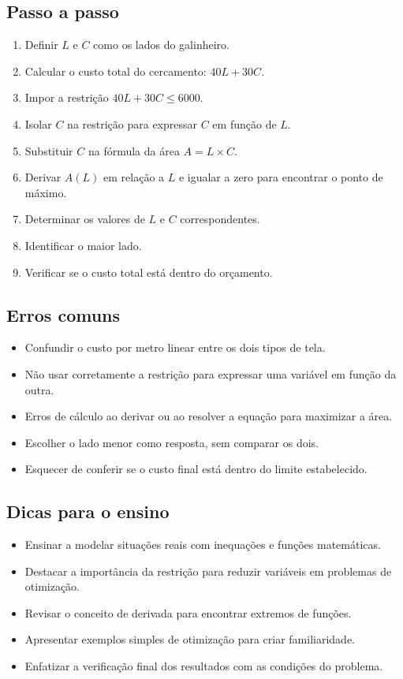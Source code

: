 \documentclass{article}
\begin{document}
\subsection{Passo a passo}
\begin{enumerate}
  \item Definir $L$ e $C$ como os lados do galinheiro.
  \item Calcular o custo total do cercamento: $40L + 30C$.
  \item Impor a restrição $40L + 30C \leq 6000$.
  \item Isolar $C$ na restrição para expressar $C$ em função de $L$.
  \item Substituir $C$ na fórmula da área $A = L \times C$.
  \item Derivar $A(L)$ em relação a $L$ e igualar a zero para encontrar o ponto de máximo.
  \item Determinar os valores de $L$ e $C$ correspondentes.
  \item Identificar o maior lado.
  \item Verificar se o custo total está dentro do orçamento.
\end{enumerate}

\subsection{Erros comuns}
\begin{itemize}
  \item Confundir o custo por metro linear entre os dois tipos de tela.
  \item Não usar corretamente a restrição para expressar uma variável em função da outra.
  \item Erros de cálculo ao derivar ou ao resolver a equação para maximizar a área.
  \item Escolher o lado menor como resposta, sem comparar os dois.
  \item Esquecer de conferir se o custo final está dentro do limite estabelecido.
\end{itemize}

\subsection{Dicas para o ensino}
\begin{itemize}
  \item Ensinar a modelar situações reais com inequações e funções matemáticas.
  \item Destacar a importância da restrição para reduzir variáveis em problemas de otimização.
  \item Revisar o conceito de derivada para encontrar extremos de funções.
  \item Apresentar exemplos simples de otimização para criar familiaridade.
  \item Enfatizar a verificação final dos resultados com as condições do problema.
\end{itemize}
\end{document}
